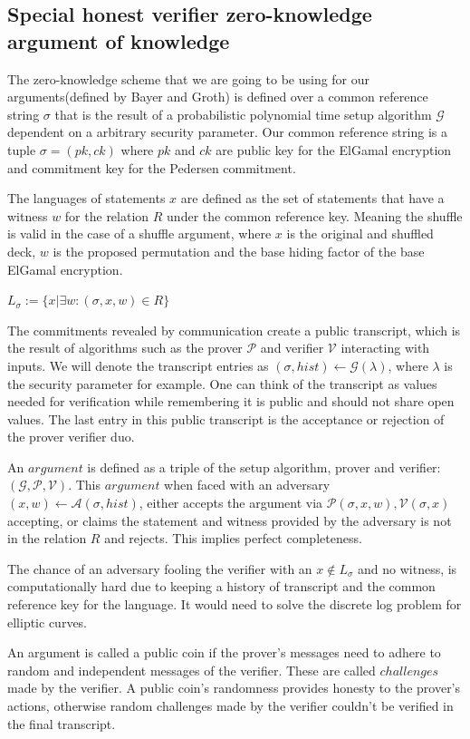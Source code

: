 \documentclass[12pt,a4paper]{report}
\begin{document}
\subsection*{Special honest verifier zero-knowledge argument of knowledge}
The zero-knowledge scheme that we are going to be using for our arguments(defined by Bayer and Groth) is defined over a common reference string $\sigma$ that is the result of a probabilistic polynomial time setup algorithm $\mathcal{G}$ dependent on a arbitrary security parameter.
Our common reference string is a tuple $\sigma = (pk, ck)$ where $pk$ and $ck$ are public key for the ElGamal encryption and commitment key for the Pedersen commitment.\par
The languages of statements $x$ are defined as the set of statements that have a witness $w$ for the relation $R$ under the common reference key. Meaning the shuffle is valid in the case of a shuffle argument, where $x$ is the original and shuffled deck, $w$ is the proposed permutation and the base hiding factor of the base ElGamal encryption.
\begin{center}
	$L_\sigma := \{x | \exists w : (\sigma, x, w) \in R\}$
\end{center}
The commitments revealed by communication create a public transcript, which is the result of algorithms such as the prover $\mathcal{P}$ and verifier $\mathcal{V}$ interacting with inputs. We will denote the transcript entries as $(\sigma, hist) \leftarrow \mathcal{G}(\lambda)$, where $\lambda$ is the security parameter for example.
One can think of the transcript as values needed for verification while remembering it is public and should not share open values. 
The last entry in this public transcript is the acceptance or rejection of the prover verifier duo.\par
An $argument$ is defined as a triple of the setup algorithm, prover and verifier: $(\mathcal{G}, \mathcal{P}, \mathcal{V})$.
This $argument$ when faced with an adversary $(x, w) \leftarrow \mathcal{A}(\sigma, hist)$, either accepts the argument via $\mathcal{P}(\sigma, x, w), \mathcal{V}(\sigma, x)$ accepting, 
or claims the statement and witness provided by the adversary is not in the relation $R$ and rejects. 
This implies perfect completeness.\par
The chance of an adversary fooling the verifier with an $x \notin L_\sigma$ and no witness, is computationally hard due to keeping a history of transcript and the common reference key for the language. It would need to solve the discrete log problem for elliptic curves.\par
An argument is called a public coin if the prover's messages need to adhere to random and independent messages of the verifier. These are called $challenges$ made by the verifier.
A public coin's randomness provides honesty to the prover's actions, otherwise random challenges made by the verifier couldn't be verified in the final transcript.
\end{document}
